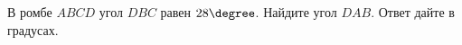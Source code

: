 \begin{ex}
	\begin{condition}
		В ромбе \( ABCD \) угол \( DBC \) равен \( 28\degree \). Найдите угол \( DAB \). Ответ дайте в градусах.
	\end{condition}
\end{ex}